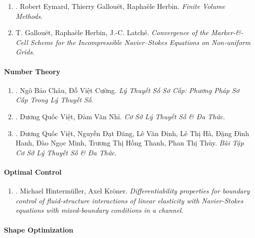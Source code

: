 \documentclass{article}
\begin{document}
\begin{enumerate}
	\item \cite{Eymard_Gallouet_Herbin2019}. Robert Eymard, Thierry Gallou\"et, Rapha\`ele Herbin. {\it Finite Volume Methods}.\hfill{\sf[reading]}

	\item T. Gallou\"et, Rapha\`ele Herbin, J.-C. Latch\'e. {\it Convergence of the Marker-\&-Cell Scheme for the Incompressible Navier--Stokes Equations on Non-uniform Grids}.\hfill{\sf[reading]}
\end{enumerate}

\paragraph{Number Theory}

\begin{enumerate}
	\item \cite{Chau_Cuong_basic_number_theory}. {\sc Ngô Bảo Châu, Đỗ Việt Cường}. {\it Lý Thuyết Số Sơ Cấp: Phương Pháp Sơ Cấp Trong Lý Thuyết Số}.\hfill{\sf[reading]}

	\item \cite{Viet_Nhi_number_theory_polynomial}. Dương Quốc Việt, Đàm Văn Nhỉ. {\it Cơ Sở Lý Thuyết Số \& Đa Thức}.\hfill{\sf[reading]}

	\item \cite{Viet_Dang_Dinh_Ha_Hanh_Minh_Thanh_Thuy2022}. Dương Quốc Việt, Nguyễn Đạt Đăng, Lê Văn Đinh, Lê Thị Hà, Đặng Đình Hanh, Đào Ngọc Minh, Trương Thị Hồng Thanh, Phan Thị Thủy. {\it Bài Tập Cơ Sở Lý Thuyết Số \& Đa Thức}.\hfill{\sf[reading]}
\end{enumerate}

\paragraph{Optimal Control}

\begin{enumerate}
	\item \cite{Hintermueller_Kroener2023}. Michael Hinterm\"uller, Axel Kr\"oner. {\it Differentiability properties for boundary control of fluid-structure interactions of linear elasticity with Navier-Stokes equations with mixed-boundary conditions in a channel}.\hfill{\sf[done]}
\end{enumerate}

\paragraph{Shape Optimization}
\end{document}
